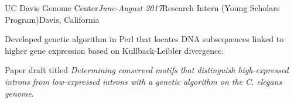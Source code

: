 \begin{rSubsection}{UC Davis Genome Center}{\em June-August 2017}{Research Intern (Young Scholars Program)}{Davis, California}
\item Developed genetic algorithm in Perl that locates DNA subsequences linked to higher gene expression based on Kullback-Leibler divergence.
\item Paper draft titled \textit{Determining conserved motifs that distinguish high-expressed introns from low-expressed introns with a genetic algorithm on the C. elegans genome}.
\end{rSubsection}